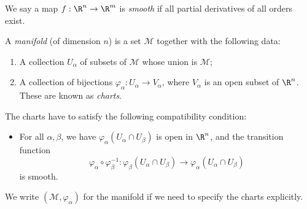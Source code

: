 \documentclass[a4paper]{article}
\begin{document}
\begin{defi}
  We say a map $f:\R^n \to \R^m$ is \emph{smooth} if all partial derivatives of all orders exist.
\end{defi}

\begin{defi}[Manifold]
  A \emph{manifold} (of dimension $n$) is a set $\mathcal{M}$ together with the following data:
  \begin{enumerate}
    \item A collection $U_\alpha$ of subsets of $\mathcal{M}$ whose union is $\mathcal{M}$;
    \item A collection of bijections $\varphi_\alpha: U_\alpha \to V_\alpha$, where $V_\alpha$ is an open subset of $\R^n$. These are known as \emph{charts}.
  \end{enumerate}
  The charts have to satisfy the following compatibility condition:
  \begin{itemize}
    \item For all $\alpha, \beta$, we have $\varphi_\alpha(U_\alpha \cap U_\beta)$ is open in $\R^n$, and the transition function
      \[
        \varphi_\alpha \circ \varphi_\beta^{-1}: \varphi_\beta(U_\alpha \cap U_\beta) \to \varphi_\alpha(U_\alpha \cap U_\beta)
      \]
      is smooth.
  \end{itemize}
  We write $(\mathcal{M}, \varphi_\alpha)$ for the manifold if we need to specify the charts explicitly.
  \begin{center}
\end{center}
\end{defi}
\end{document}
